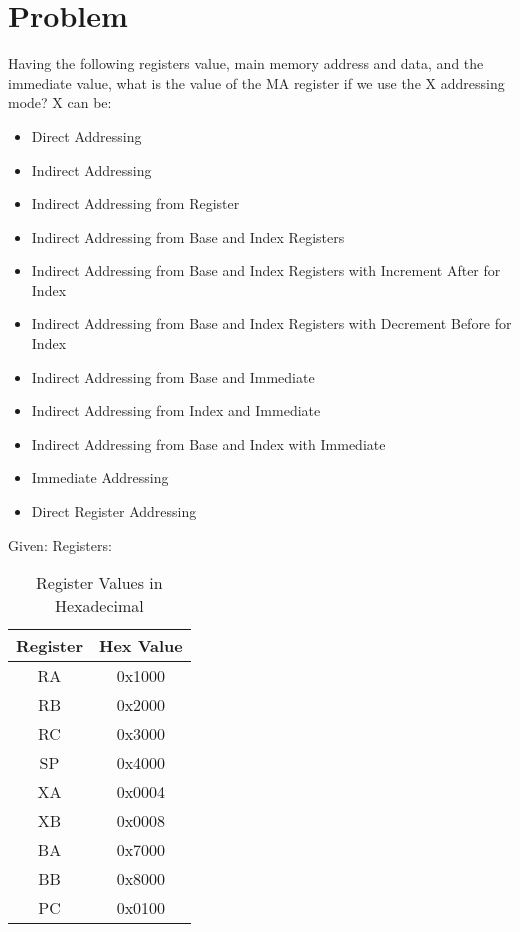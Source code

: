 \section*{Problem}

Having the following registers value, main memory address and data, and the immediate value, what is the value of the MA register if we use the X addressing mode? X can be:
\begin{itemize}
    \item Direct Addressing
    \item Indirect Addressing
    \item Indirect Addressing from Register
    \item Indirect Addressing from Base and Index Registers
    \item Indirect Addressing from Base and Index Registers with Increment After for Index
    \item Indirect Addressing from Base and Index Registers with Decrement Before for Index
    \item Indirect Addressing from Base and Immediate
    \item Indirect Addressing from Index and Immediate
    \item Indirect Addressing from Base and Index with Immediate
    \item Immediate Addressing
    \item Direct Register Addressing
\end{itemize}

Given:
Registers:
\begin{table}[h!]
    \centering
    \begin{tabular}{|c|c|}
    \hline
    \textbf{Register} & \textbf{Hex Value} \\
    \hline
    RA & 0x1000 \\
    \hline
    RB & 0x2000 \\
    \hline
    RC & 0x3000 \\
    \hline
    SP & 0x4000 \\
    \hline
    XA & 0x0004 \\
    \hline
    XB & 0x0008 \\
    \hline
    BA & 0x7000 \\
    \hline
    BB & 0x8000 \\
    \hline
    PC & 0x0100 \\
    \hline
    \end{tabular}
    \caption{Register Values in Hexadecimal}
\end{table}


